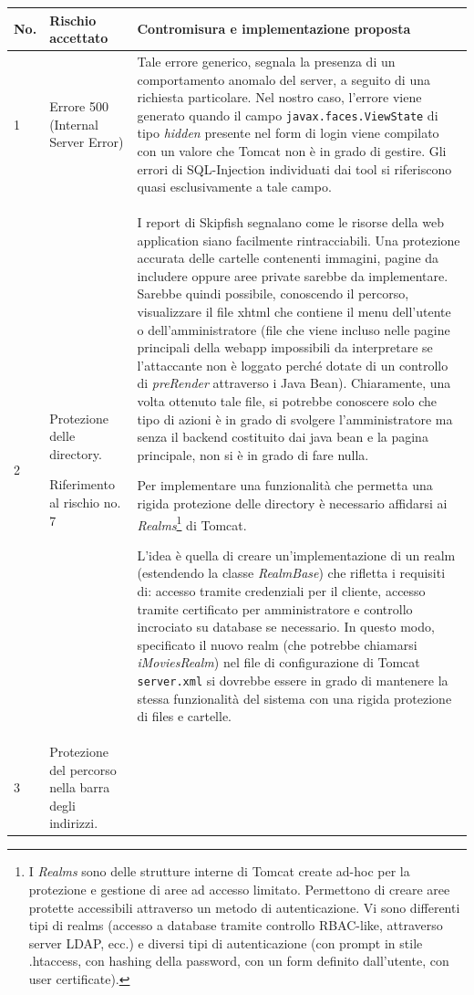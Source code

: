 \documentclass{article}
\begin{document}
\begin{footnotesize}
\begin{longtable}{p{0.3cm}p{4cm}p{7cm}}
No. & Rischio accettato & Contromisura e implementazione proposta  \\
\hline
1 & Errore 500 (Internal Server Error) & Tale errore generico, segnala la presenza di un comportamento anomalo del server, a seguito di una richiesta particolare. Nel nostro caso, l'errore viene generato quando il campo {\tt javax.faces.ViewState} di tipo \emph{hidden} presente nel form di login viene compilato con un valore che Tomcat non è in grado di gestire. Gli errori di SQL-Injection individuati dai tool si riferiscono quasi esclusivamente a tale campo. \\
\hline
2 & Protezione delle directory.  

Riferimento al rischio no. 7 & I report di Skipfish segnalano come le risorse della web application siano facilmente rintracciabili. Una protezione accurata delle cartelle contenenti immagini, pagine da includere oppure aree private sarebbe da implementare. Sarebbe quindi possibile, conoscendo il percorso, visualizzare il file xhtml che contiene il menu dell'utente o dell'amministratore (file che viene incluso nelle pagine principali della webapp impossibili da interpretare se l'attaccante non è loggato perché dotate di un controllo di \emph{preRender} attraverso i Java Bean). Chiaramente, una volta ottenuto tale file, si potrebbe conoscere solo che tipo di azioni è in grado di svolgere l'amministratore ma senza il backend costituito dai java bean e la pagina principale, non si è in grado di fare nulla.

Per implementare una funzionalità che permetta una rigida protezione delle directory è necessario affidarsi ai \emph{Realms}\footnote{
I \emph{Realms} sono delle strutture interne di Tomcat create ad-hoc per la protezione e gestione di aree ad accesso limitato. Permettono di creare aree protette accessibili attraverso un metodo di autenticazione. Vi sono differenti tipi di realms (accesso a database tramite controllo RBAC-like, attraverso server LDAP, ecc.) e diversi tipi di autenticazione (con prompt in stile .htaccess, con hashing della password, con un form definito dall'utente, con user certificate).} di Tomcat.

L'idea è quella di creare un'implementazione di un realm (estendendo la classe \emph{RealmBase}) che rifletta i requisiti di: accesso tramite credenziali per il cliente, accesso tramite certificato per amministratore e controllo incrociato su database se necessario. In questo modo, specificato il nuovo realm (che potrebbe chiamarsi \emph{iMoviesRealm}) nel file di configurazione di Tomcat {\tt server.xml} si dovrebbe essere in grado di mantenere la stessa funzionalità del sistema con una rigida protezione di files e cartelle.\\ 
\hline
3 & Protezione del percorso nella barra degli indirizzi. 


\end{longtable}
\end{footnotesize}
\end{document}
